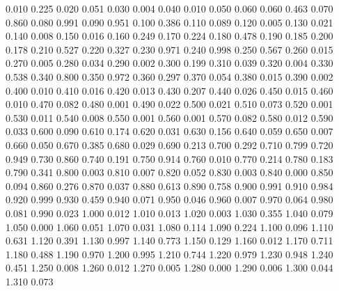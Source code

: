 0.010 0.225
0.020 0.051
0.030 0.004
0.040 0.010
0.050 0.060
0.060 0.463
0.070 0.860
0.080 0.991
0.090 0.951
0.100 0.386
0.110 0.089
0.120 0.005
0.130 0.021
0.140 0.008
0.150 0.016
0.160 0.249
0.170 0.224
0.180 0.478
0.190 0.185
0.200 0.178
0.210 0.527
0.220 0.327
0.230 0.971
0.240 0.998
0.250 0.567
0.260 0.015
0.270 0.005
0.280 0.034
0.290 0.002
0.300 0.199
0.310 0.039
0.320 0.004
0.330 0.538
0.340 0.800
0.350 0.972
0.360 0.297
0.370 0.054
0.380 0.015
0.390 0.002
0.400 0.010
0.410 0.016
0.420 0.013
0.430 0.207
0.440 0.026
0.450 0.015
0.460 0.010
0.470 0.082
0.480 0.001
0.490 0.022
0.500 0.021
0.510 0.073
0.520 0.001
0.530 0.011
0.540 0.008
0.550 0.001
0.560 0.001
0.570 0.082
0.580 0.012
0.590 0.033
0.600 0.090
0.610 0.174
0.620 0.031
0.630 0.156
0.640 0.059
0.650 0.007
0.660 0.050
0.670 0.385
0.680 0.029
0.690 0.213
0.700 0.292
0.710 0.799
0.720 0.949
0.730 0.860
0.740 0.191
0.750 0.914
0.760 0.010
0.770 0.214
0.780 0.183
0.790 0.341
0.800 0.003
0.810 0.007
0.820 0.052
0.830 0.003
0.840 0.000
0.850 0.094
0.860 0.276
0.870 0.037
0.880 0.613
0.890 0.758
0.900 0.991
0.910 0.984
0.920 0.999
0.930 0.459
0.940 0.071
0.950 0.046
0.960 0.007
0.970 0.064
0.980 0.081
0.990 0.023
1.000 0.012
1.010 0.013
1.020 0.003
1.030 0.355
1.040 0.079
1.050 0.000
1.060 0.051
1.070 0.031
1.080 0.114
1.090 0.224
1.100 0.096
1.110 0.631
1.120 0.391
1.130 0.997
1.140 0.773
1.150 0.129
1.160 0.012
1.170 0.711
1.180 0.488
1.190 0.970
1.200 0.995
1.210 0.744
1.220 0.979
1.230 0.948
1.240 0.451
1.250 0.008
1.260 0.012
1.270 0.005
1.280 0.000
1.290 0.006
1.300 0.044
1.310 0.073
